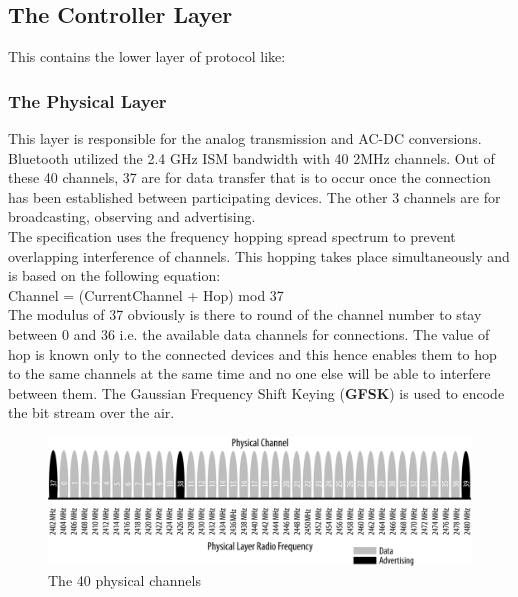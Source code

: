 \subsection{The Controller Layer}
This contains the lower layer of protocol like:
\subsubsection{The Physical Layer}
This layer is responsible for the analog transmission and AC-DC conversions. Bluetooth utilized the 2.4 GHz ISM bandwidth with 40 2MHz channels. Out of these 40 channels, 37 are for data transfer that is to occur once the connection has been established between participating devices. The other 3 channels are for broadcasting, observing and advertising.\\
The specification uses the frequency hopping spread spectrum to prevent overlapping interference of channels. This hopping takes place simultaneously and is based on the following equation:\\
Channel = (CurrentChannel + Hop) mod 37\\
The modulus of 37 obviously is there to round of the channel number to stay between 0 and 36 i.e. the available data channels for connections. The value of hop is known only to the connected devices and this hence enables them to hop to the same channels at the same time and no one else will be able to interfere between them.
The Gaussian Frequency Shift Keying (\textbf{GFSK}) is used to encode the bit stream over the air.
\begin{figure}[ht]
	\centering
	\includegraphics[scale=0.3]{images/physical_channel.png}
	\caption{The 40 physical channels}
\end{figure}
